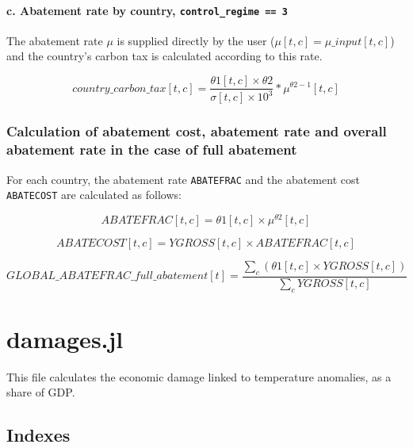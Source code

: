 \documentclass[
]{article}
\begin{document}
\paragraph{\texorpdfstring{c. Abatement rate by country,
\texttt{control\_regime\ ==\ 3}}{c. Abatement rate by country, control\_regime == 3}}\label{c.-abatement-rate-by-country-control_regime-3}

The abatement rate \(\mu\) is supplied directly by the user
(\(\mu[t,c] = \mu\_input[t,c]\)) and the country's carbon tax is
calculated according to this rate.

\begin{equation}
 country\_carbon\_tax[t,c] =  \frac{\theta1[t,c] \times \theta2}{\sigma[t,c] \times 10^3} * \mu^{\theta2 - 1}[t,c]
\end{equation}


\subsubsection{Calculation of abatement cost, abatement rate and overall
abatement rate in the case of full
abatement}\label{calculation-of-abatement-cost-abatement-rate-and-overall-abatement-rate-in-the-case-of-full-abatement}

For each country, the abatement rate \texttt{ABATEFRAC} and the
abatement cost \texttt{ABATECOST} are calculated as follows:

\begin{equation}
ABATEFRAC[t,c] = \theta1[t,c] \times \mu^{\theta2}[t,c] 
\end{equation}


\begin{equation}
ABATECOST[t,c] = YGROSS[t,c] \times ABATEFRAC[t,c]
\end{equation}


\begin{equation}
GLOBAL\_ABATEFRAC\_full\_abatement[t] = \frac{\sum_{c} (\theta1[t,c] \times YGROSS[t,c])}{\sum_{c} YGROSS[t,c]} 
\end{equation}


\section{damages.jl}\label{damages.jl}

This file calculates the economic damage linked to temperature
anomalies, as a share of GDP.

\subsection{Indexes}\label{indexes-1}
\end{document}
